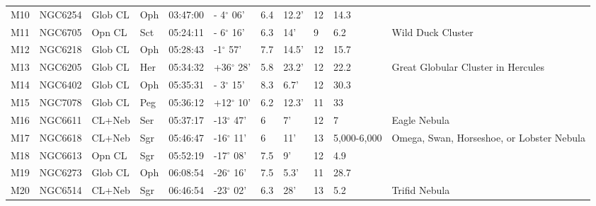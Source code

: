 \begin{longtable}{@{}lllllllllll@{}}
M10        & NGC6254     & Glob CL    & Oph       & 03:47:00 & - 4$^{\circ}$ 06'  & 6.4       & 12.2'                & 12       & 14.3                &                                           \\
M11        & NGC6705     & Opn CL     & Sct       & 05:24:11 & - 6$^{\circ}$ 16'  & 6.3       & 14'                  & 9        & 6.2                 & Wild Duck Cluster                         \\
M12        & NGC6218     & Glob CL    & Oph       & 05:28:43 & -1$^{\circ}$ 57'   & 7.7       & 14.5'                & 12       & 15.7                &                                           \\
M13        & NGC6205     & Glob CL    & Her       & 05:34:32 & +36$^{\circ}$ 28'  & 5.8       & 23.2'                & 12       & 22.2                & Great Globular Cluster in Hercules        \\
M14        & NGC6402     & Glob CL    & Oph       & 05:35:31 & - 3$^{\circ}$ 15'  & 8.3       & 6.7'                 & 12       & 30.3                &                                           \\
M15        & NGC7078     & Glob CL    & Peg       & 05:36:12 & +12$^{\circ}$ 10'  & 6.2       & 12.3'                & 11       & 33                  &                                           \\
M16        & NGC6611     & CL+Neb     & Ser       & 05:37:17 & -13$^{\circ}$ 47'  & 6         & 7'                   & 12       & 7                   & Eagle Nebula                              \\
M17        & NGC6618     & CL+Neb     & Sgr       & 05:46:47 & -16$^{\circ}$ 11'  & 6         & 11'                  & 13       & 5,000-6,000         & Omega, Swan, Horseshoe, or Lobster Nebula \\
M18        & NGC6613     & Opn CL     & Sgr       & 05:52:19 & -17$^{\circ}$ 08'  & 7.5       & 9'                   & 12       & 4.9                 &                                           \\
M19        & NGC6273     & Glob CL    & Oph       & 06:08:54 & -26$^{\circ}$ 16'  & 7.5       & 5.3'                 & 11       & 28.7                &                                           \\
M20        & NGC6514     & CL+Neb     & Sgr       & 06:46:54 & -23$^{\circ}$ 02'  & 6.3       & 28'                  & 13       & 5.2                 & Trifid Nebula                             \\

\end{longtable}
